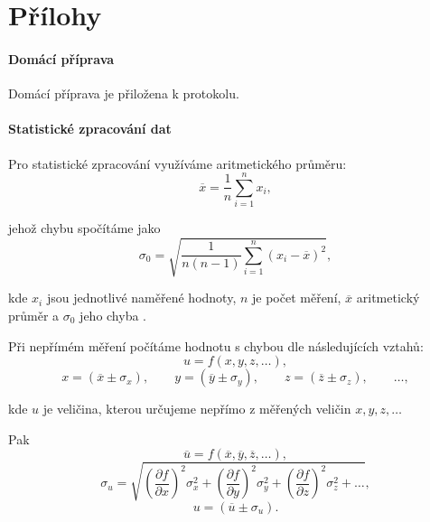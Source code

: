 \documentclass[english]{article}
\begin{document}
\clearpage
\part{Přílohy}

\subsection{Domácí příprava}
	Domácí příprava je přiložena k protokolu.
\subsection{Statistické zpracování dat}
	Pro statistické zpracování využíváme aritmetického průměru:
	\begin{equation} \label{eq:aritmeticky_prumer}
	\overline{x} = \frac{1}{n}\sum\limits_{i=1}^{n}x_i,
	\end{equation}
	
	jehož chybu spočítáme jako 
	\begin{equation} \label{eq:chyba_aritmetickeho_prumeru}
	\sigma_0 = \sqrt{\frac{1}{n(n-1)} \sum\limits_{i=1}^{n}\left( x_i - \overline{x} \right)^2 },
	\end{equation}
	
	kde $ x_i $ jsou jednotlivé naměřené hodnoty, $ n $ je počet měření, $ \overline{x} $ aritmetický průměr a $ \sigma_0 $ jeho chyba \cite{bib:chyby}.
	
Při nepřímém měření počítáme hodnotu s chybou dle následujících vztahů:
	\begin{equation}
	u = f(x, y, z, \ldots),
	\end{equation}
	\begin{displaymath}
	x = (\overline{x} \pm \sigma_x), \qquad
	y = (\overline{y} \pm \sigma_y), \qquad
	z = (\overline{z} \pm \sigma_z), \qquad
	\ldots,
	\end{displaymath}
	
	kde $ u $ je veličina, kterou určujeme nepřímo z měřených veličin $ x, y, z, \ldots $ 
	
	Pak
	\begin{displaymath}
	\overline{u} = f(\overline{x}, \overline{y}, \overline{z}, \ldots),
	\end{displaymath}
	\begin{equation}\label{eq:chyba_neprime_mereni}
	\sigma_u = \sqrt{\left( \frac{\partial f}{\partial x} \right)^2 \sigma^2_x + \left( \frac{\partial f}{\partial y} \right)^2 \sigma^2_y + \left( \frac{\partial f}{\partial z} \right)^2 \sigma^2_z + \ldots},
	\end{equation}
	\begin{displaymath}
	u = (\overline{u} \pm \sigma_ u).
	\end{displaymath}
	
\end{document}
